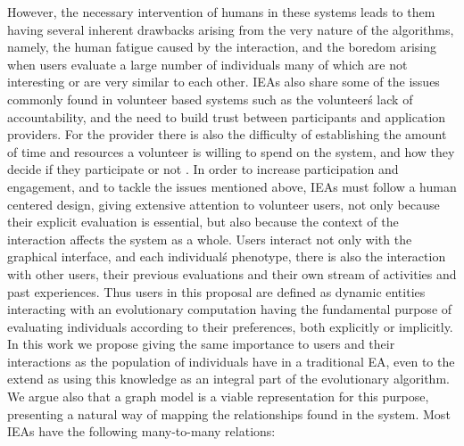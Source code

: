 \documentclass[conference]{IEEEtran}
\begin{document}
However, the necessary intervention of humans in these systems leads
to them having several inherent drawbacks arising from the very nature of 
the algorithms, namely, the human fatigue caused by the interaction, and
the boredom arising when users evaluate a large number of individuals 
many of which are not interesting or are very similar to each other.
IEAs also share some of the issues commonly found in volunteer based systems
\cite{sarmenta2001volunteer,web:BOINC} such as the volunteer\'s lack of accountability,
and the need to build trust between participants and application providers. 
For the provider there is also the difficulty of establishing 
the amount of time and resources
a volunteer is willing to spend on the system, and how they decide if they
participate or not \cite{JJ:2016}. In order to increase participation and 
engagement, and to tackle the issues mentioned above,  
IEAs must follow a human centered design, %
giving extensive attention 
to volunteer users, not only because their
explicit evaluation is essential, but also because the context of the 
interaction affects the system as a whole. Users interact not only with the graphical
interface, and each individual\'s phenotype, there is also the interaction
with other users, their previous evaluations and their own stream of activities
and past experiences. Thus users in this proposal are defined as dynamic entities 
interacting with an evolutionary computation having the fundamental purpose 
of evaluating individuals according to their preferences,
both explicitly or implicitly. In this work we propose giving the same
importance to users and their interactions as the population of 
individuals have in a traditional EA, even to the extend as using this
knowledge as an integral part of the evolutionary algorithm. We argue also
that a graph model is a viable representation for this purpose,  
presenting a natural way of mapping the relationships found in the system. 
Most IEAs have the following many-to-many relations:
\end{document}
